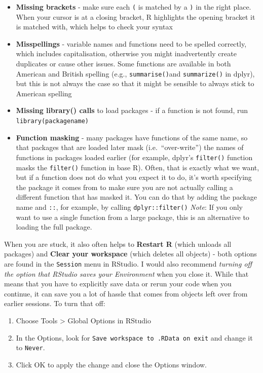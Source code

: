 \documentclass[
]{book}
\providecommand{\tightlist}{%
  \setlength{\itemsep}{0pt}\setlength{\parskip}{0pt}}
\begin{document}
\begin{itemize}
\tightlist
\item
  \textbf{Missing brackets} - make sure each \texttt{(} is matched by a \texttt{)} in the right place. When your cursor is at a closing bracket, R highlights the opening bracket it is matched with, which helps to check your syntax
\item
  \textbf{Misspellings} - variable names and functions need to be spelled correctly, which includes capitalisation, otherwise you might inadvertently create duplicates or cause other issues. Some functions are available in both American and British spelling (e.g., \texttt{summarise()}and \texttt{summarize()} in dplyr), but this is not always the case so that it might be sensible to always stick to American spelling
\item
  \textbf{Missing library() calls} to load packages - if a function is not found, run \texttt{library(packagename)}
\item
  \textbf{Function masking} - many packages have functions of the same name, so that packages that are loaded later mask (i.e.~``over-write'') the names of functions in packages loaded earlier (for example, dplyr's \texttt{filter()} function masks the \texttt{filter()} function in base R). Often, that is exactly what we want, but if a function does not do what you expect it to do, it's worth specifying the package it comes from to make sure you are not actually calling a different function that has masked it. You can do that by adding the package name and \texttt{::}, for example, by calling \texttt{dplyr::filter()} \emph{Note}: If you only want to use a single function from a large package, this is an alternative to loading the full package.
\end{itemize}

When you are stuck, it also often helps to \textbf{Restart R} (which unloads all packages) and \textbf{Clear your workspace} (which deletes all objects) - both options are found in the \texttt{Session} menu in RStudio. I would also recommend \emph{turning off the option that RStudio saves your Environment} when you close it. While that means that you have to explicitly save data or rerun your code when you continue, it can save you a lot of hassle that comes from objects left over from earlier sessions. To turn that off:

\begin{enumerate}
\def\labelenumi{\arabic{enumi}.}
\tightlist
\item
  Choose Tools \textgreater{} Global Options in RStudio
\item
  In the Options, look for \texttt{Save\ workspace\ to\ .RData\ on\ exit} and change it to \texttt{Never}.
\item
  Click OK to apply the change and close the Options window.
\end{enumerate}
\end{document}
